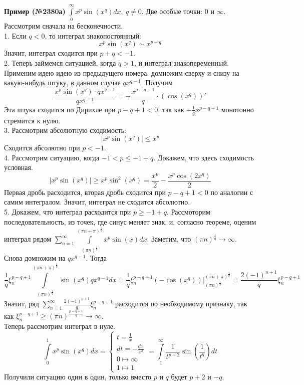 \textbf{Пример (№2380а)} $\int\limits_{0}^{\infty}x^p\sin(x^q)dx,~q\ne 0$. 
Две особые точки: $0$ и  $\infty$. Рассмотрим сначала на бесконечности.\\
1. Если $q<0$, то интеграл знакопостоянный:
$$x^p\sin(x^q)\sim x^{p+q}$$ 
Значит, интеграл сходится при $p+q<-1$.\\
2. Теперь займемся ситуацией, когда $q>1$, и интеграл знакопеременный. 
Применим идею идею из предыдущего номера:
домножим сверху и снизу на какую-нибудь штуку, в данном случае $qx^{q-1}$. 
Получим
$$\frac{x^p\sin(x^q)\cdot qx^{q-1}}{qx^{q-1}}=- \frac{x^{p-q+1}}{q}\cdot 
(\cos(x^q))'$$
Эта штука сходится по Дирихле при $p-q+1<0$, так как $-\frac{1}{q}x^{p-q+1}$ 
монотонно стремится к нулю.\\
3. Рассмотрим абсолютную сходимость:
$$|x^p\sin(x^q)|\leqslant x^p $$
Сходится абсолютно при $p<-1$.\\
4. Рассмотрим ситуацию, когда  $-1< p\leqslant -1+q$. Докажем, что 
здесь сходимость условная.
$$|x^p\sin(x^q)|\geqslant x^p\sin^2(x^q)=\frac{x^p}{2}-
\frac{x^p\cos(2x^q)}{2}$$
Первая дробь расходится, вторая дробь сходится при $p-q+1<0$ по аналогии
с самим интегралом. Значит, интеграл не сходится абсолютно.\\
5. Докажем, что интеграл расходится при $p\geqslant -1 + q$.
Рассмоторим последовательность, из точек, где синус меняет знак, и, согласно
теореме, оценим интеграл рядом 
$\sum\limits_{n=1}^{\infty}\int\limits_{(\pi n)^
{\frac{1}{q}}}^{(\pi n+\pi)^{\frac{1}{q}}}x^p\sin(x)dx$. 
Заметим, что $(\pi n)^{\frac{1}{q}}\to \infty$. Снова домножим на $qx^{q-1}$.
Тогда
$$\frac{1}{q}\xi_n^{p-q+1}\int\limits_{(\pi n)^{\frac{1}{q}}}^{(\pi n+\pi)^
{\frac{1}{q}}}\sin(x^q)qx^{q-1}dx=
\frac{1}{q}\xi_n^{p-q+1}\left( -\cos(x^q) \right)
\big|_{(\pi n)^{\frac{1}{q}}}^{(\pi n+\pi)^{\frac{1}{q}}}=
\frac{2(-1)^{n+1}}{q}\xi_n^{p-q+1}$$
Значит, ряд $\sum\limits_{n=1}^{\infty}\frac{2(-1)^{n+1}}{q}\xi_n^{p-q+1}$
расходится по необходимому признаку, так как $\xi_n^{p-q+1}\geqslant
(\pi n)^{\frac{p-q+1}{q}}\to \infty$.\\
Теперь рассмотрим интеграл в нуле. 
$$\int\limits_{0}^{1}x^p\sin(x^q)dx=\begin{cases}t=\frac{1}{x}\\
dt=-\frac{dx}{x^2}\\0\mapsto \infty\\1\mapsto 1 \end{cases}=
\int\limits_{1}^{\infty}\frac{1}{t^{p+2}}\sin\left(\frac{1}{t^q}\right)dt$$
Получили ситуацию один в один, только вместо $p$ и $q$ будет
$p+2$ и $-q$. 

